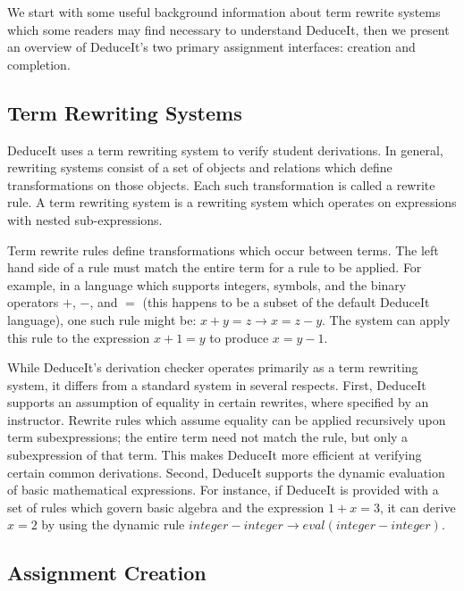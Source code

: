 \documentclass{sigchi}
\begin{document}
We start with some useful background information about term rewrite systems which some readers may find necessary to understand DeduceIt, then we present an overview of DeduceIt's two primary assignment interfaces: creation and completion.

\subsection{Term Rewriting Systems}

DeduceIt uses a term rewriting system to verify student derivations. In general, rewriting systems consist of a set of objects and relations which define transformations on those objects. Each such transformation is called a rewrite rule. A term rewriting system is a rewriting system which operates on expressions with nested sub-expressions.

Term rewrite rules define transformations which occur between terms. The left hand side of a rule must match the entire term for a rule to be applied. For example, in a language which supports integers, symbols, and the binary operators $+$, $-$, and $=$ (this happens to be a subset of the default DeduceIt language), one such rule might be: $x+y=z \rightarrow x=z-y$. The system can apply this rule to the expression $x+1=y$ to produce $x=y-1$.

While DeduceIt's derivation checker operates primarily as a term rewriting system, it differs from a standard system in several respects. First, DeduceIt supports an assumption of equality in certain rewrites, where specified by an instructor. Rewrite rules which assume equality can be applied recursively upon term subexpressions; the entire term need not match the rule, but only a subexpression of that term. This makes DeduceIt more efficient at verifying certain common derivations. Second, DeduceIt supports the dynamic evaluation of basic mathematical expressions. For instance, if DeduceIt is provided with a set of rules which govern basic algebra and the expression $1+x=3$, it can derive $x=2$ by using the dynamic rule $integer-integer \rightarrow eval(integer-integer)$.

\subsection{Assignment Creation}
\end{document}
